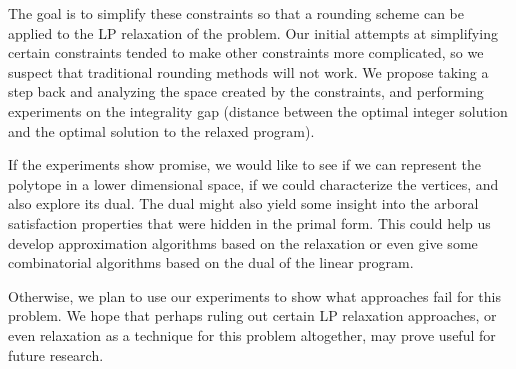 \documentclass[11pt]{article}
\begin{document}
The goal is to simplify these constraints so that a rounding scheme can be applied to the LP relaxation of the problem. Our initial attempts at simplifying certain constraints tended to make other constraints more complicated, so we suspect that traditional rounding methods will not work. We propose taking a step back and analyzing the space created by the constraints, and performing experiments on the integrality gap (distance between the optimal integer solution and the optimal solution to the relaxed program). 

If the experiments show promise, we would like to see if we can represent the polytope in a lower dimensional space, if we could characterize the vertices, and also explore its dual. The dual might also yield some insight into the arboral satisfaction properties that were hidden in the primal form. This could help us develop approximation algorithms based on the relaxation or even give some combinatorial algorithms based on the dual of the linear program. 

Otherwise, we plan to use our experiments to show what approaches fail for this problem. We hope that perhaps ruling out certain LP relaxation approaches, or even relaxation as a technique for this problem altogether, may prove useful for future research.
%
%
%
%
%
%
%
\end{document}
